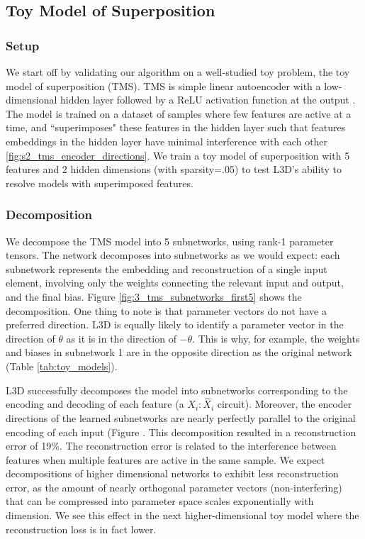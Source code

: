\documentclass{article}
\theoremstyle{plain}
\theoremstyle{definition}
\theoremstyle{remark}
\begin{document}
\subsection{Toy Model of Superposition}

\subsubsection{Setup}

We start off by validating our algorithm on a well-studied toy problem, the toy model of superposition (TMS). TMS is simple linear autoencoder with a low-dimensional hidden layer followed by a ReLU activation function at the output \cite{elhage2022toy}. The model is trained on a dataset of samples where few features are active at a time, and ``superimposes" these features in the hidden layer such that features embeddings in the hidden layer have minimal interference with each other \ref{fig:s2_tms_encoder_directions}. We train a toy model of superposition with 5 features and 2 hidden dimensions (with sparsity=.05) to test L3D's ability to resolve models with superimposed features.

\subsubsection{Decomposition}

We decompose the TMS model into 5 subnetworks, using rank-1 parameter tensors. The network decomposes into subnetworks as we would expect: each subnetwork represents the embedding and reconstruction of a single input element, involving only the weights connecting the relevant input and output, and the final bias. Figure \ref{fig:3_tms_subnetworks_first5} shows the decomposition. One thing to note is that parameter vectors do not have a preferred direction. L3D is equally likely to identify a parameter vector in the direction of $\theta$ as it is in the direction of $-\theta$. This is why, for example, the weights and biases in subnetwork 1 are in the opposite direction as the original network (Table \ref{tab:toy_models}).

 L3D successfully decomposes the model into subnetworks corresponding to the encoding and decoding of each feature (a $X_i:\hat{X}_i$ circuit). Moreover, the encoder directions of the learned subnetworks are nearly perfectly parallel to the original encoding of each input (Figure .  This decomposition resulted in a reconstruction error of 19\%. The reconstruction error is related to the interference between features when multiple features are active in the same sample. We expect decompositions of higher dimensional networks to exhibit less reconstruction error, as the amount of nearly orthogonal parameter vectors (non-interfering) that can be compressed into parameter space scales exponentially with dimension. We see this effect in the next higher-dimensional toy model where the reconstruction loss is in fact lower. 
\end{document}
